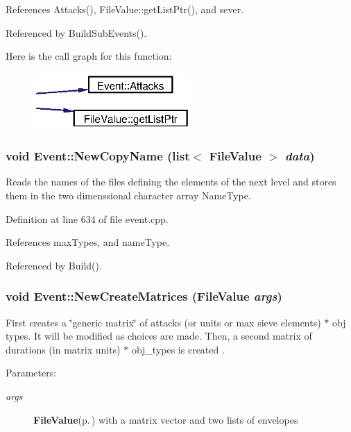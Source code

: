 References Attacks(), File\-Value::get\-List\-Ptr(), and sever.

Referenced by Build\-Sub\-Events().

Here is the call graph for this function:\begin{figure}[H]
\begin{center}
\leavevmode
\includegraphics[width=170pt]{classEvent_a34_cgraph}
\end{center}
\end{figure}
\subsubsection{\setlength{\rightskip}{0pt plus 5cm}void Event::New\-Copy\-Name (list$<$ {\bf File\-Value} $>$ {\em data})}\label{classEvent_a29}


Reads the names of the files defining the elements of the next level and stores them in the two dimenssional character array Name\-Type. 

Definition at line 634 of file event.cpp.

References max\-Types, and name\-Type.

Referenced by Build().
\subsubsection{\setlength{\rightskip}{0pt plus 5cm}void Event::New\-Create\-Matrices ({\bf File\-Value} {\em args})}\label{classEvent_a51}


First creates a \char`\"{}generic matrix\char`\"{} of attacks (or units or max sieve elements) $\ast$ obj types. It will be modified as choices are made. Then, a second matrix of durations (in matrix units) $\ast$ obj\_\-types is created . \begin{Desc}
\item[Parameters:]
\begin{description}
\item[{\em args}]{\bf File\-Value}{\rm (p.\,\pageref{classFileValue})} with a matrix vector and two lists of envelopes \end{description}
\end{Desc}



